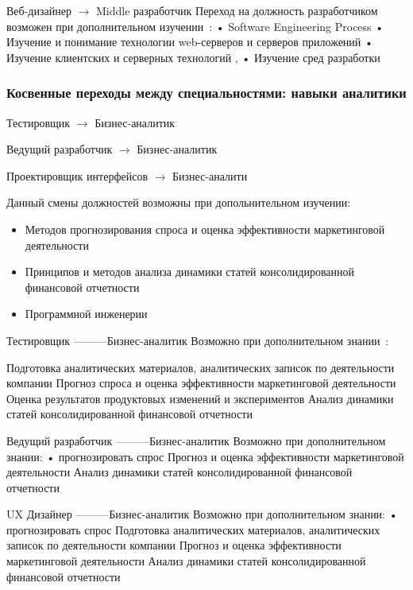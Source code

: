 \documentclass{../industrial-development}
\begin{document}
\lecturenotes

Веб-дизайнер $\rightarrow$  Middle разработчик
Переход на должность разработчиком возможен при дополнительном изучении~\cite{rab}:
•	Software Engineering Process
•	Изучение и понимание технологии web-серверов и серверов приложений
•	Изучение клиентских и серверных технологий , 
•	Изучение сред разработки


\begin{frame} \frametitle{Косвенные переходы между специальностями: навыки аналитики }

\begin{block}{Тестировщик $\rightarrow$ Бизнес-аналитик  

Ведущий разработчик $\rightarrow$ Бизнес-аналитик  

Проектировщик интерфейсов $\rightarrow$ Бизнес-аналити}

Данный смены должностей возможны при допольнительном изучении:
  \end{block}
 \begin{itemize}
\item Методов прогнозирования спроса и оценка эффективности маркетинговой деятельности
\item Принципов и методов анализа динамики статей консолидированной финансовой отчетности
\item Программной инженерии
 \end{itemize}
\end{frame}

\lecturenotes


Тестировщик ---------Бизнес-аналитик
Возможно при дополнительном знании~\cite{rab}:

 Подготовка аналитических материалов, аналитических записок по деятельности компании
Прогноз спроса и оценка эффективности маркетинговой деятельности
 Оценка результатов продуктовых изменений и экспериментов
Анализ динамики статей консолидированной финансовой отчетности

Ведущий разработчик ---------Бизнес-аналитик
Возможно при дополнительном знании:
•	прогнозировать спрос 
 Прогноз и оценка эффективности маркетинговой деятельности
 Анализ динамики статей консолидированной финансовой отчетности

UX Дизайнер ---------Бизнес-аналитик
Возможно при дополнительном знании:
•	прогнозировать спрос 
Подготовка аналитических материалов, аналитических записок по деятельности компании
 Прогноз и оценка эффективности маркетинговой деятельности
 Анализ динамики статей консолидированной финансовой отчетности
\end{document}
